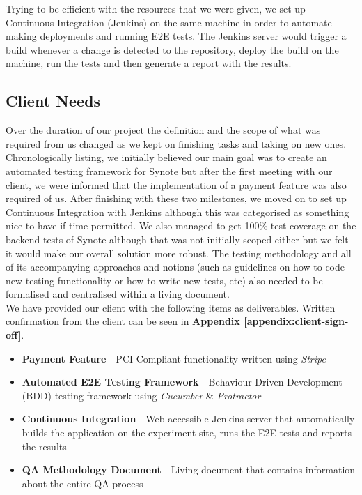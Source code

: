 Trying to be efficient with the resources that we were given, we set up Continuous Integration (Jenkins) on the same machine in order to automate making deployments and running E2E tests. The Jenkins server would trigger a build whenever a change is detected to the repository, deploy the build on the machine, run the tests and then generate a report with the results.

\subsection{Client Needs}
\label{subsec:client-needs}

Over the duration of our project the definition and the scope of what was required from us changed as we kept on finishing tasks and taking on new ones. \\

Chronologically listing, we initially believed our main goal was to create an automated testing framework for Synote but after the first meeting with our client, we were informed that the implementation of a payment feature was also required of us. After finishing with these two milestones, we moved on to set up Continuous Integration with Jenkins although this was categorised as something nice to have if time permitted. We also managed to get 100\% test coverage on the backend tests of Synote although that was not initially scoped either but we felt it would make our overall solution more robust. The testing methodology and all of its accompanying approaches and notions (such as guidelines on how to code new testing functionality or how to write new tests, etc) also needed to be formalised and centralised within a living document. \\

We have provided our client with the following items as deliverables. Written confirmation from the client can be seen in \textbf{Appendix \ref{appendix:client-sign-off}}.

\begin{itemize}
    \item \textbf{Payment Feature} - PCI Compliant functionality written using \textit{Stripe}
    \item \textbf{Automated E2E Testing Framework} - Behaviour Driven Development (BDD) testing framework using \textit{Cucumber} \& \textit{Protractor}
    \item \textbf{Continuous Integration} - Web accessible Jenkins server that automatically builds the application on the experiment site, runs the E2E tests and reports the results
    \item \textbf{QA Methodology Document} - Living document that contains information about the entire QA process
\end{itemize}

